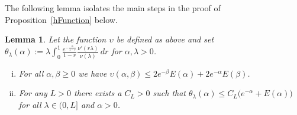 \documentclass[10pt]{article}
\numberwithin{equation}{section}
\newtheorem{lemma}[theorem]{Lemma}
\theoremstyle{definition}
\begin{document}
The following lemma isolates the main steps in the proof of Proposition~\ref{hFunction} below.
\begin{lemma}\label{LemmaLittleUpsilon} Let the function $\upsilon$ be defined as above and set $\theta_{\lambda}(\alpha):=\lambda \int_0^1\frac{ e^{-\frac{\alpha}{1-r  }}  }{1-r   }\frac{\nu'( r \lambda ) }{\nu(\lambda)  }\,dr $ for $\alpha,\lambda>0$.

\begin{enumerate}[(i)] 
    \item  For all $\alpha,\beta\geq 0$ we have
$\upsilon(\alpha,\beta)\leq   2 e^{-\beta  } E(\alpha)+2 e^{-\alpha  } E(\beta)$.

    \item  For any $L>0$ there exists a  $C_L>0$ such that $\theta_{\lambda}(\alpha)\leq C_{L}\big(e^{-\alpha}  +  E( \alpha)\big)$ for all $\lambda\in (0,L]$ and $\alpha>0$.


    
\end{enumerate}



\end{lemma}
\end{document}
